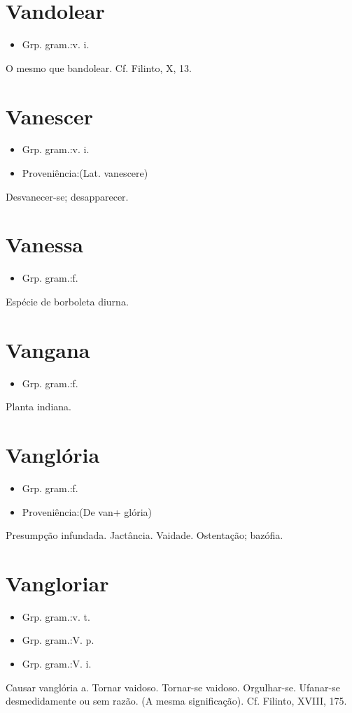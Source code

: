 \documentclass{article}
\begin{document}
\section{Vandolear}
\begin{itemize}
\item {Grp. gram.:v. i.}
\end{itemize}
O mesmo que \textunderscore bandolear\textunderscore . Cf. Filinto, X, 13.
\section{Vanescer}
\begin{itemize}
\item {Grp. gram.:v. i.}
\end{itemize}
\begin{itemize}
\item {Proveniência:(Lat. \textunderscore vanescere\textunderscore )}
\end{itemize}
Desvanecer-se; desapparecer.
\section{Vanessa}
\begin{itemize}
\item {Grp. gram.:f.}
\end{itemize}
Espécie de borboleta diurna.
\section{Vangana}
\begin{itemize}
\item {Grp. gram.:f.}
\end{itemize}
Planta indiana.
\section{Vanglória}
\begin{itemize}
\item {Grp. gram.:f.}
\end{itemize}
\begin{itemize}
\item {Proveniência:(De \textunderscore van\textunderscore  + \textunderscore glória\textunderscore )}
\end{itemize}
Presumpção infundada.
Jactância.
Vaidade.
Ostentação; bazófia.
\section{Vangloriar}
\begin{itemize}
\item {Grp. gram.:v. t.}
\end{itemize}
\begin{itemize}
\item {Grp. gram.:V. p.}
\end{itemize}
\begin{itemize}
\item {Grp. gram.:V. i.}
\end{itemize}
Causar vanglória a.
Tornar vaidoso.
Tornar-se vaidoso.
Orgulhar-se.
Ufanar-se desmedidamente ou sem razão.
(A mesma significação). Cf. Filinto, XVIII, 175.
\end{document}

